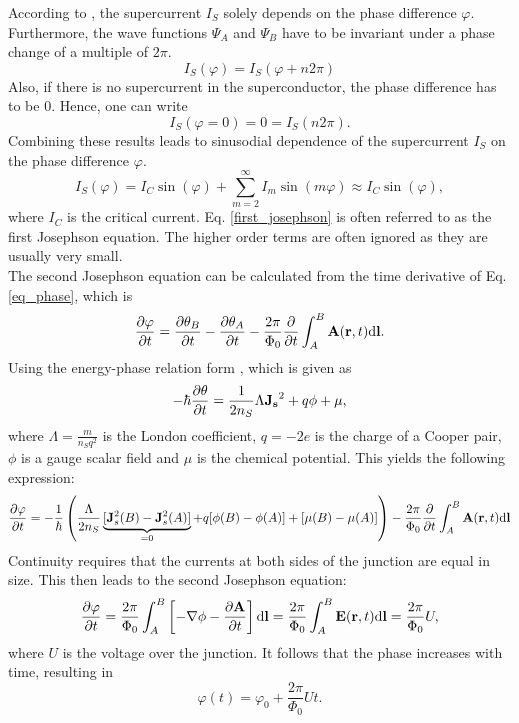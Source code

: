 \documentclass[a4paper,10pt]{article}
\newcommand{\dif}{\mathrm{d}}
\begin{document}
According to \cite{skriptum}, the supercurrent $I_S$ solely depends on the phase difference $\varphi$. Furthermore, the wave functions $\Psi_A$ and $\Psi_B$ have to be invariant under a phase change of a multiple of $2 \pi$. 
\begin{equation}
    I_S(\varphi) = I_S(\varphi + n 2 \pi)
\end{equation}
Also, if there is no supercurrent in the superconductor, the phase difference has to be $0$. Hence, one can write 
\begin{equation}
    I_S(\varphi = 0) = 0 = I_S( n 2 \pi).
\end{equation}
Combining these results leads to sinusodial dependence of the supercurrent $I_S$ on the phase difference $\varphi$.
\begin{equation}
    I_S(\varphi) = I_C \sin(\varphi) + \sum^{\infty}_{m = 2} I_m \sin(m \varphi) \approx I_C \sin(\varphi),
    \label{first_josephson}
\end{equation}
where $I_C$ is the critical current. Eq. \ref{first_josephson} is often referred to as the first Josephson equation. The higher order terms are often ignored as they are usually very small. \\
The second Josephson equation can be calculated from the time derivative of Eq. \ref{eq_phase}, which is 
\begin{equation}
    \pdv{\varphi}{t} = \pdv{\theta_B}{t} - \pdv{\theta_A}{t} - \frac{2 \pi}{\Phi_0} \pdv{}{t} \int^B_A \mathbf{A}(\mathbf{r},t) \dif \mathbf{l}.
\end{equation}
Using the energy-phase relation form \cite{grossmarx}, which is given as 
\begin{equation}
    -\hbar \pdv{\theta}{t} = \frac{1}{2 n_S} \Lambda \mathbf{J_s}^2 + q \phi + \mu,
\end{equation}
where $\Lambda = \frac{m}{n_S q^2}$ is the London coefficient, $q = -2 e$ is the charge of a Cooper pair, $\phi$ is a gauge scalar field and $\mu$ is the chemical potential. This yields the following expression:
\begin{equation}
    \pdv{\varphi}{t} = - \frac{1}{\hbar} \left( \frac{\Lambda}{2 n_S} \underbrace{[\mathbf{J}_s^2(B) - \mathbf{J}_s^2(A)]}_{ = 0} + q[\phi(B) - \phi(A)] + [\mu(B) - \mu(A)] \right) -  \frac{2 \pi}{\Phi_0} \pdv{}{t} \int^B_A \mathbf{A}(\mathbf{r},t) \dif \mathbf{l}
\end{equation}
Continuity requires that the currents at both sides of the junction are equal in size. This then leads to the second Josephson equation:
\begin{equation}
\pdv{\varphi}{t} = \frac{2 \pi}{\Phi_0} \int^B_A \left[ - \nabla \phi - \pdv{\mathbf{A}}{t} \right] \dif \mathbf{l} = \frac{2 \pi}{\Phi_0} \int^B_A \mathbf{E}(\mathbf{r},t) \dif \mathbf{l} = \frac{2 \pi}{\Phi_0} U,
\end{equation}
where $U$ is the voltage over the junction. It follows that the phase increases with time, resulting in 
\begin{equation}
    \varphi(t) = \varphi_0 + \frac{2 \pi}{\Phi_0} U t.
    \label{eq_josephson_2}
\end{equation}
\end{document}
